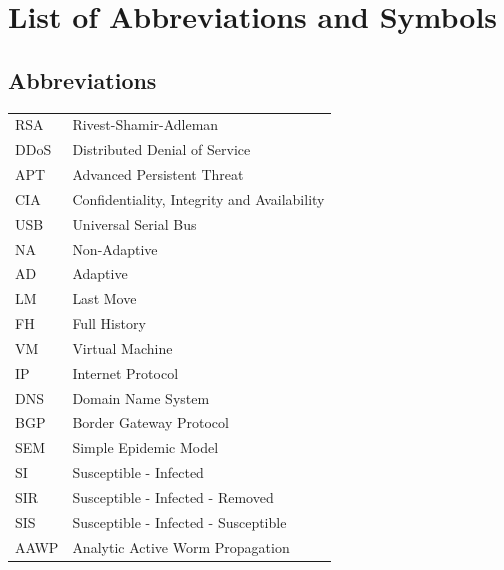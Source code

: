 \documentclass[master=cws, masteroption=vs,english]{kulemt}
\begin{document}
\listoffiguresandtables
\chapter{List of Abbreviations and Symbols}
\section*{Abbreviations}
\begin{flushleft}
  \renewcommand{\arraystretch}{1.1}
  \begin{tabularx}{\textwidth}{@{}p{12mm}X@{}}
    RSA & Rivest-Shamir-Adleman \\
    DDoS & Distributed Denial of Service \\
    APT & Advanced Persistent Threat \\
    CIA & Confidentiality, Integrity and Availability \\
    USB & Universal Serial Bus \\
    NA & Non-Adaptive \\ 
    AD & Adaptive \\
    LM & Last Move \\
    FH & Full History \\
    VM & Virtual Machine \\
    IP & Internet Protocol \\
    DNS & Domain Name System \\
    BGP & Border Gateway Protocol \\
    SEM & Simple Epidemic Model \\
    SI & Susceptible - Infected \\
    SIR & Susceptible - Infected - Removed \\
    SIS & Susceptible - Infected - Susceptible \\
    AAWP & Analytic Active Worm Propagation\\
      \end{tabularx}
\end{flushleft}
\end{document}
